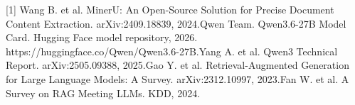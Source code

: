 \documentclass[UTF8,a4paper,11pt]{ctexart}
\begin{document}
[1] Wang B. et al. MinerU: An Open-Source Solution for Precise Document Content Extraction. arXiv:2409.18839, 2024.\newline [2] Qwen Team. Qwen3.6-27B Model Card. Hugging Face model repository, 2026. https://huggingface.co/Qwen/Qwen3.6-27B.\newline [3] Yang A. et al. Qwen3 Technical Report. arXiv:2505.09388, 2025.\newline [4] Gao Y. et al. Retrieval-Augmented Generation for Large Language Models: A Survey. arXiv:2312.10997, 2023.\newline [5] Fan W. et al. A Survey on RAG Meeting LLMs. KDD, 2024.\par
\end{document}
